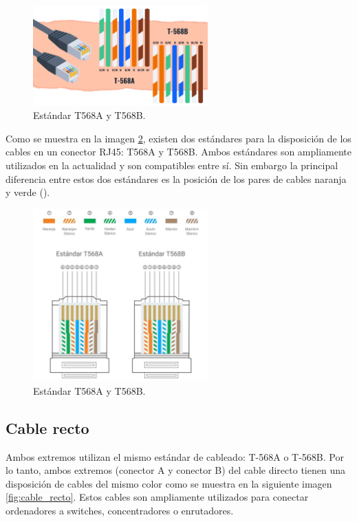     \begin{figure}[H]
        \centering
        \includegraphics[width=0.6\textwidth]{img/estandar.jpg}
        \caption{Estándar T568A y T568B.}
        \label{fig:estandar}
    \end{figure}

    Como se muestra en la imagen \ref{fig:estandar_t568a_y_t568b}, existen dos estándares para la disposición de los cables en un conector RJ45: T568A y T568B. Ambos estándares son ampliamente utilizados en la actualidad y son compatibles entre sí.
    Sin embargo la principal diferencia entre estos dos estándares es la posición de los pares de cables naranja y verde (\cite{Cruzado}).

    \begin{figure}[H]
        \centering
        \includegraphics[width=0.6\textwidth]{img/rj45.jpg}
        \caption{Estándar T568A y T568B.}
        \label{fig:estandar_t568a_y_t568b}
    \end{figure}

    \subsection{Cable recto}
    Ambos extremos utilizan el mismo estándar de cableado: T-568A o T-568B. Por lo tanto, ambos extremos (conector A y conector B) del cable directo tienen una disposición de cables del mismo color como se muestra en la siguiente imagen \ref{fig:cable_recto}. Estos cables son ampliamente utilizados para conectar ordenadores a switches, concentradores o enrutadores.
    
